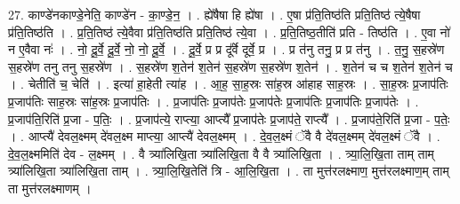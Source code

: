 \documentclass[17pt]{extarticle}
\begin{document}
27. काण्डे॑नकाण्डे॒नेति॒ काण्डे॑न - का॒ण्डे॒न॒ । . ह्ये॑षैषा हि ह्ये॑षा । . ए॒षा प्र॑ति॒तिष्ठ॑ति प्रति॒तिष्ठ॑ त्ये॒षैषा प्र॑ति॒तिष्ठ॑ति । . प्र॒ति॒तिष्ठ॑ त्ये॒वैवा प्र॑ति॒तिष्ठ॑ति प्रति॒तिष्ठ॑ त्ये॒वा । . प्र॒ति॒तिष्ठ॒तीति॑ प्रति - तिष्ठ॑ति । . ए॒वा नो॑ न ए॒वैवा नः॑ । . नो॒ दू॒र्वे॒ दू॒र्वे॒ नो॒ नो॒ दू॒र्वे॒ । . दू॒र्वे॒ प्र प्र दू᳚र्वे दूर्वे॒ प्र । . प्र त॑नु तनु॒ प्र प्र त॑नु । . त॒नु॒ स॒हस्रे॑ण स॒हस्रे॑ण तनु तनु स॒हस्रे॑ण । . स॒हस्रे॑ण श॒तेन॑ श॒तेन॑ स॒हस्रे॑ण स॒हस्रे॑ण श॒तेन॑ । . श॒तेन॑ च च श॒तेन॑ श॒तेन॑ च । . चेतीति॑ च॒ चेति॑ । . इत्या॑ हा॒हेती त्या॑ह । . आ॒ह॒ सा॒ह॒स्रः सा॑ह॒स्र आ॑हाह साह॒स्रः । . सा॒ह॒स्रः प्र॒जाप॑तिः प्र॒जाप॑तिः साह॒स्रः सा॑ह॒स्रः प्र॒जाप॑तिः । . प्र॒जाप॑तिः प्र॒जाप॑तेः प्र॒जाप॑तेः प्र॒जाप॑तिः प्र॒जाप॑तिः प्र॒जाप॑तेः । . प्र॒जाप॑ति॒रिति॑ प्र॒जा - प॒तिः॒ । . प्र॒जाप॑त्ये॒ राप्त्या॒ आप्त्यै᳚ प्र॒जाप॑तेः प्र॒जाप॑ते॒ राप्त्यै᳚ । . प्र॒जाप॑ते॒रिति॑ प्र॒जा - प॒तेः॒ । . आप्त्यै॑ देवल॒क्ष्मम् दे॑वल॒क्ष्म माप्त्या॒ आप्त्यै॑ देवल॒क्ष्मम् । . दे॒व॒ल॒क्ष्मं ॅवै वै दे॑वल॒क्ष्मम् दे॑वल॒क्ष्मं ॅवै । . दे॒व॒ल॒क्ष्ममिति॑ देव - ल॒क्ष्मम् । . वै त्र्या॑लिखि॒ता त्र्या॑लिखि॒ता वै वै त्र्या॑लिखि॒ता । . त्र्या॒लि॒खि॒ता ताम् ताम् त्र्या॑लिखि॒ता त्र्या॑लिखि॒ता ताम् । . त्र्या॒लि॒खि॒तेति॑ त्रि - आ॒लि॒खि॒ता । . ता मुत्त॑रलक्ष्माण॒ मुत्त॑रलक्ष्माण॒म् ताम् ता मुत्त॑रलक्ष्माणम् । \newline
\end{document}
